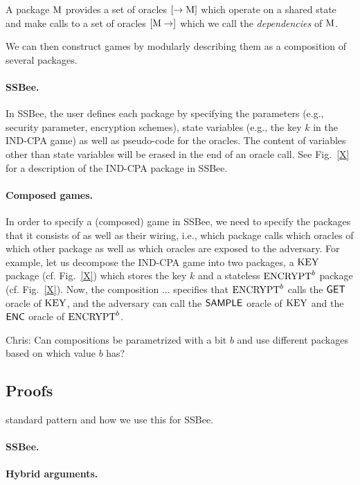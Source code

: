 \begin{definition}[Package]
A package $\text{\textrm{\upshape M}}$ provides a set of oracles $[\rightarrow \text{\textrm{\upshape M}}]$
which operate on a shared state and make calls to a set of oracles
$[\text{\textrm{\upshape M}}\rightarrow]$ which we call the \emph{dependencies} of $\text{\textrm{\upshape M}}$.
\end{definition}

We can then construct games by modularly describing them as a composition
of several packages.

\paragraph{SSBee.} In SSBee, the user defines each package by specifying
the parameters (e.g., security parameter, encryption schemes), state
variables (e.g., the key $k$ in the IND-CPA game) as well as pseudo-code
for the oracles. The content of variables other than state variables will
be erased in the end of an oracle call. See Fig.~\ref{X} for a description
of the IND-CPA package in SSBee.

\paragraph{Composed games.} In order to specify a (composed) game in SSBee, 
we need to specify the packages that it consists of as well as their wiring,
i.e., which package calls which oracles of which other package as well as
which oracles are exposed to the adversary. For example, let us
decompose the IND-CPA game into two packages, 
a $\text{\textrm{\upshape KEY}}$ package (cf. Fig.~\ref{X})
which stores the key $k$ and a stateless 
$\text{\textrm{\upshape ENCRYPT}}^b$ package (cf. Fig.~\ref{X}). Now, the composition ...
specifies that $\text{\textrm{\upshape ENCRYPT}}^b$ calls the $\mathsf{GET}$ oracle of $\text{\textrm{\upshape KEY}}$,
and the adversary can call the $\mathsf{SAMPLE}$ oracle of $\text{\textrm{\upshape KEY}}$ and the
$\mathsf{ENC}$ oracle of $\text{\textrm{\upshape ENCRYPT}}^b$.

{\color{blue}Chris: Can compositions be parametrized with a bit $b$ and
use different packages based on which value $b$ has?}

\subsection{Proofs}
standard pattern and how we use this for SSBee.

\paragraph{SSBee.}

\paragraph{Hybrid arguments.}
